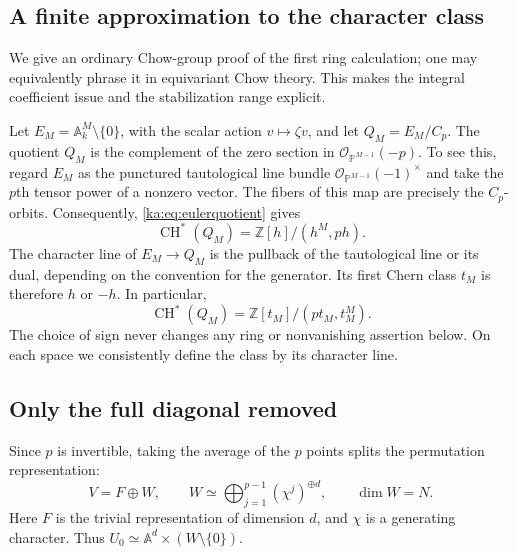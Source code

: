 \documentclass[11pt,a4paper]{article}
\theoremstyle{definition}
\theoremstyle{remark}
\newcommand{\Z}{\mathbb Z}
\newcommand{\A}{\mathbb A}
\newcommand{\Pj}{\mathbb P}
\newcommand{\OO}{\mathcal O}
\newcommand{\CH}{\operatorname{CH}}
\begin{document}
\subsection{A finite approximation to the character class}
We give an ordinary Chow-group proof of the first ring calculation;
one may equivalently phrase it in equivariant Chow theory. This makes
the integral coefficient issue and the stabilization range explicit.

Let $E_M=\A_k^M\setminus\{0\}$, with the scalar action
$v\mapsto\zeta v$, and let $Q_M=E_M/C_p$. The quotient $Q_M$ is the
complement of the zero section in $\OO_{\Pj^{M-1}}(-p)$. To see this,
regard $E_M$ as the punctured tautological line bundle
$\OO_{\Pj^{M-1}}(-1)^\times$ and take the $p$th tensor power of a
nonzero vector. The fibers of this map are precisely the $C_p$-orbits.
Consequently, \eqref{ka:eq:eulerquotient} gives
\begin{equation}
 \CH^*(Q_M)=\Z[h]/(h^M,ph).
 \label{ka:eq:approxclassifying}
\end{equation}
The character line of $E_M\to Q_M$ is the pullback of the tautological
line or its dual, depending on the convention for the generator. Its
first Chern class $t_M$ is therefore $h$ or $-h$. In particular,
\begin{equation}
 \CH^*(Q_M)=\Z[t_M]/(pt_M,t_M^M).
 \label{ka:eq:approxclassifying2}
\end{equation}
The choice of sign never changes any ring or nonvanishing assertion
below. On each space we consistently define the class by its character
line.

\subsection{Only the full diagonal removed}
Since $p$ is invertible, taking the average of the $p$ points splits the
permutation representation:
\begin{equation}
 V=F\oplus W,\qquad
 W\simeq\bigoplus_{j=1}^{p-1}(\chi^j)^{\oplus d},
 \qquad \dim W=N.
 \label{ka:eq:normalrepresentation}
\end{equation}
Here $F$ is the trivial representation of dimension $d$, and $\chi$
is a generating character. Thus
$U_0\simeq\A^d\times(W\setminus\{0\})$.
\end{document}
